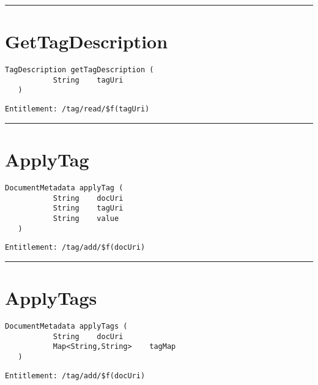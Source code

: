 \rule{12cm}{2pt}
\section{GetTagDescription}
\label{Api:GetTagDescription}
\begin{lstlisting}[style=nonumbers]
   TagDescription getTagDescription (
           String    tagUri
   )
\end{lstlisting}
\begin{Verbatim}[formatcom=\color{Maroon}]
  Entitlement: /tag/read/$f(tagUri)
\end{Verbatim}



\rule{12cm}{2pt}
\section{ApplyTag}
\label{Api:ApplyTag}
\begin{lstlisting}[style=nonumbers]
   DocumentMetadata applyTag (
           String    docUri
           String    tagUri
           String    value
   )
\end{lstlisting}
\begin{Verbatim}[formatcom=\color{Maroon}]
  Entitlement: /tag/add/$f(docUri)
\end{Verbatim}



\rule{12cm}{2pt}
\section{ApplyTags}
\label{Api:ApplyTags}
\begin{lstlisting}[style=nonumbers]
   DocumentMetadata applyTags (
           String    docUri
           Map<String,String>    tagMap
   )
\end{lstlisting}
\begin{Verbatim}[formatcom=\color{Maroon}]
  Entitlement: /tag/add/$f(docUri)
\end{Verbatim}



